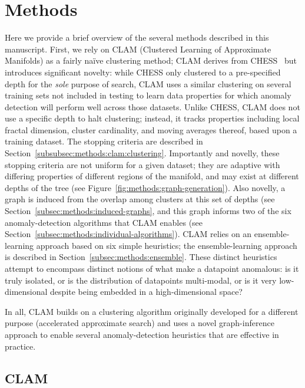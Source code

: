 \section{Methods}
\label{sec:methods}
\label{subsec:methods:overview}

Here we provide a brief overview of the several methods described in this manuscript.
First, we rely on CLAM (Clustered Learning of Approximate Manifolds) as a fairly na\"ive clustering method; CLAM derives from CHESS~\cite{ishaq2019clustered} but introduces significant novelty: while CHESS only clustered to a pre-specified depth for the \emph{sole} purpose of search, CLAM uses a similar clustering on several training sets not included in testing to learn data properties for which anomaly detection will perform well across those datasets.
Unlike CHESS, CLAM does not use a specific depth to halt clustering; instead, it tracks properties including local fractal dimension, cluster cardinality, and moving averages thereof, based upon a training dataset. 
The stopping criteria are described in Section~\ref{subsubsec:methods:clam:clustering}.
Importantly and novelly, these stopping criteria are not uniform for a given dataset; they are adaptive with differing properties of different regions of the manifold, and may exist at different depths of the tree (see Figure~\ref{fig:methods:graph-generation}).
Also novelly, a graph is induced from the overlap among clusters at this set of depths (see Section~\ref{subsec:methods:induced-graphs}, and this graph informs two of the six anomaly-detection algorithms that CLAM enables (see Section~\ref{subsec:methods:individual-algorithms}).
CLAM relies on an ensemble-learning approach based on six simple heuristics; the ensemble-learning approach is described in Section~\ref{subsec:methods:ensemble}.
These distinct heuristics attempt to encompass distinct notions of what make a datapoint anomalous: is it truly isolated, or is the distribution of datapoints multi-modal, or is it very low-dimensional despite being embedded in a high-dimensional space?

In all, CLAM builds on a clustering algorithm originally developed for a different purpose (accelerated approximate search) and uses a novel graph-inference approach to enable several anomaly-detection heuristics that are effective in practice.


\subsection{CLAM}
\label{subsec:methods:clam}

